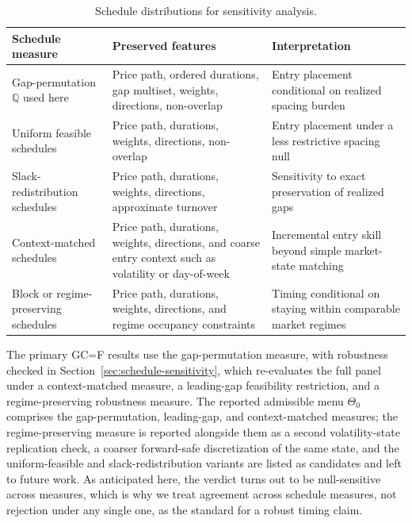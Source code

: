 \documentclass[preprint,12pt]{elsarticle}
\theoremstyle{definition}
\begin{document}
\begin{table}[H]
\centering
\caption{Schedule distributions for sensitivity analysis.}
\label{tab:schedule_measures}
\small
\renewcommand{\arraystretch}{1.12}
\begin{tabular}{@{}>{\raggedright\arraybackslash}p{}>{\raggedright\arraybackslash}p{}>{\raggedright\arraybackslash}p{}@{}}
\toprule
Schedule measure & Preserved features & Interpretation \\
\midrule
Gap-permutation $\mathbb{Q}$ used here & Price path, ordered durations, gap multiset, weights, directions, non-overlap & Entry placement conditional on realized spacing burden \\
Uniform feasible schedules & Price path, durations, weights, directions, non-overlap & Entry placement under a less restrictive spacing null \\
Slack-redistribution schedules & Price path, durations, weights, directions, approximate turnover & Sensitivity to exact preservation of realized gaps \\
Context-matched schedules & Price path, durations, weights, directions, and coarse entry context such as volatility or day-of-week & Incremental entry skill beyond simple market-state matching \\
Block or regime-preserving schedules & Price path, durations, weights, directions, and regime occupancy constraints & Timing conditional on staying within comparable market regimes \\
\bottomrule
\end{tabular}
\end{table}

The primary GC=F results use the gap-permutation measure, with robustness checked in Section~\ref{sec:schedule-sensitivity}, which re-evaluates the full panel under a context-matched measure, a leading-gap feasibility restriction, and a regime-preserving robustness measure. The reported admissible menu $\Theta_0$ comprises the gap-permutation, leading-gap, and context-matched measures; the regime-preserving measure is reported alongside them as a second volatility-state replication check, a coarser forward-safe discretization of the same state, and the uniform-feasible and slack-redistribution variants are listed as candidates and left to future work. As anticipated here, the verdict turns out to be null-sensitive across measures, which is why we treat agreement across schedule measures, not rejection under any single one, as the standard for a robust timing claim.
\end{document}
